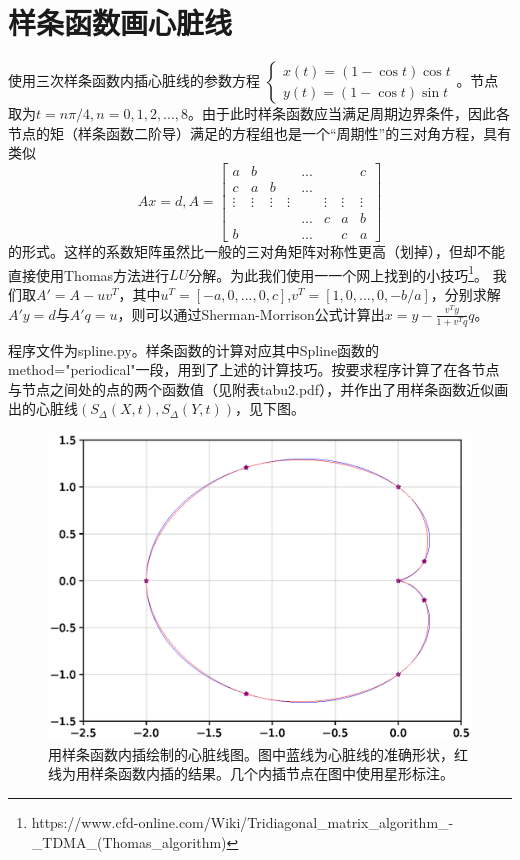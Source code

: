 \documentclass[UTF8]{ctexart}
\begin{document}
\section{样条函数画心脏线}
使用三次样条函数内插心脏线的参数方程
$\begin{cases}
x(t)=(1-\cos t)\cos t\\
y(t)=(1-\cos t)\sin t
\end{cases}$。节点取为$t=n\pi/4,n=0,1,2,...,8$。由于此时样条函数应当满足周期边界条件，因此各节点的矩（样条函数二阶导）满足的方程组也是一个“周期性”的三对角方程，具有类似
\begin{equation*}
Ax=d,A=
\begin{bmatrix}
a&b&&&...&&&c\\
c&a&b&&...&&&\\
\vdots&\vdots&\vdots&\vdots&&\vdots&\vdots&\vdots\\
&&&&...&c&a&b\\
b&&&&...&&c&a
\end{bmatrix}
\end{equation*}
的形式。这样的系数矩阵虽然比一般的三对角矩阵对称性更高（划掉），但却不能直接使用Thomas方法进行$LU$分解。为此我们使用一一个网上找到的小技巧\footnote{https://www.cfd-online.com/Wiki/Tridiagonal\_matrix\_algorithm\_-\_TDMA\_(Thomas\_algorithm)}。
我们取$A'=A-uv^T$，其中$u^T=[-a,0,...,0,c]$,$v^T=[1,0,...,0,-b/a]$，分别求解$A'y=d$与$A'q=u$，则可以通过Sherman-Morrison公式计算出$x=y-\frac{v^Ty}{1+v^Tq}q$。

程序文件为spline.py。样条函数的计算对应其中Spline函数的method="periodical"一段，用到了上述的计算技巧。按要求程序计算了在各节点与节点之间处的点的两个函数值（见附表tabu2.pdf），并作出了用样条函数近似画出的心脏线$(S_{\Delta}(X,t),S_{\Delta}(Y,t))$，见下图。
\begin{figure}[h]
  \includegraphics[width=\linewidth,keepaspectratio=true]{cardioid.eps}
  \caption{用样条函数内插绘制的心脏线图。图中蓝线为心脏线的准确形状，红线为用样条函数内插的结果。几个内插节点在图中使用星形标注。}
\end{figure}
\end{document}
